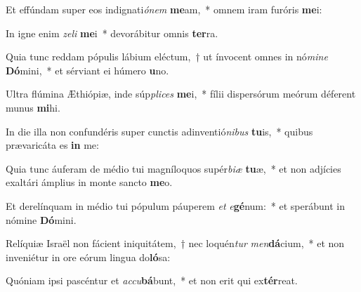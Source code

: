 \item Et effúndam super eos indignati\textit{ó}\textit{nem} \textbf{me}am,~* omnem iram furóris \textbf{me}i:
\item In igne enim \textit{ze}\textit{li} \textbf{me}i~* devorábitur omnis \textbf{ter}ra.
\item Quia tunc reddam pópulis lábium eléctum,~† ut ínvocent omnes in nó\textit{mi}\textit{ne} \textbf{Dó}mini,~* et sérviant ei húmero \textbf{u}no.
\item Ultra flúmina Æthiópiæ, inde súp\textit{pli}\textit{ces} \textbf{me}i,~* fílii dispersórum meórum déferent munus \textbf{mi}hi.
\item In die illa non confundéris super cunctis adinventió\textit{ni}\textit{bus} \textbf{tu}is,~* quibus prævaricáta es \textbf{in} me:
\item Quia tunc áuferam de médio tui magníloquos supér\textit{bi}\textit{æ} \textbf{tu}æ,~* et non adjícies exaltári ámplius in monte sancto \textbf{me}o.
\item Et derelínquam in médio tui pópulum páuperem \textit{et} \textit{e}\textbf{gé}num:~* et sperábunt in nómine \textbf{Dó}mini.
\item Relíquiæ Israël non fácient iniquitátem,~† nec loquén\textit{tur} \textit{men}\textbf{dá}cium,~* et non inveniétur in ore eórum lingua do\textbf{ló}sa:
\item Quóniam ipsi pascéntur et \textit{ac}\textit{cu}\textbf{bá}bunt,~* et non erit qui ex\textbf{tér}reat.
